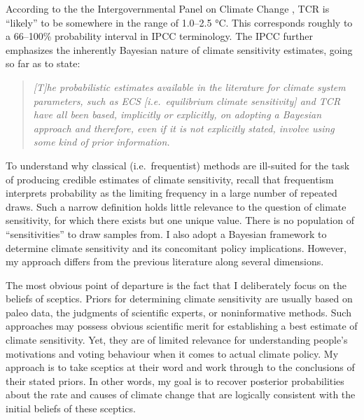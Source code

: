 \documentclass[smallextended]{svjour3}       %
\begin{document}
According to the the Intergovernmental Panel on Climate Change
\cite{ipcc2013i}, TCR is ``likely'' to be somewhere in the range of
1.0--2.5 °C. This corresponds roughly to a 66--100\% probability
interval in IPCC terminology. The IPCC further emphasizes the inherently
Bayesian nature of climate sensitivity estimates, going so far as to
state:

\begin{quote}
\emph{{[}T{]}he probabilistic estimates available in the literature for
climate system parameters, such as ECS {[}i.e.~equilibrium climate
sensitivity{]} and TCR have all been based, implicitly or explicitly, on
adopting a Bayesian approach and therefore, even if it is not explicitly
stated, involve using some kind of prior information.}
\cite[p. 922]{ipcc2013i}
\end{quote}

To understand why classical (i.e.~frequentist) methods are ill-suited
for the task of producing credible estimates of climate sensitivity,
recall that frequentism interprets probability as the limiting frequency
in a large number of repeated draws. Such a narrow definition holds
little relevance to the question of climate sensitivity, for which there
exists but one unique value. There is no population of ``sensitivities''
to draw samples from. I also adopt a Bayesian framework to determine
climate sensitivity and its concomitant policy implications. However, my
approach differs from the previous literature along several dimensions.

The most obvious point of departure is the fact that I deliberately
focus on the beliefs of sceptics. Priors for determining climate
sensitivity are usually based on paleo data, the judgments of scientific
experts, or noninformative methods. Such approaches may possess obvious
scientific merit for establishing a best estimate of climate
sensitivity. Yet, they are of limited relevance for understanding
people's motivations and voting behaviour when it comes to actual
climate policy. My approach is to take sceptics at their word and work
through to the conclusions of their stated priors. In other words, my
goal is to recover posterior probabilities about the rate and causes of
climate change that are logically consistent with the initial beliefs of
these sceptics.
\end{document}
